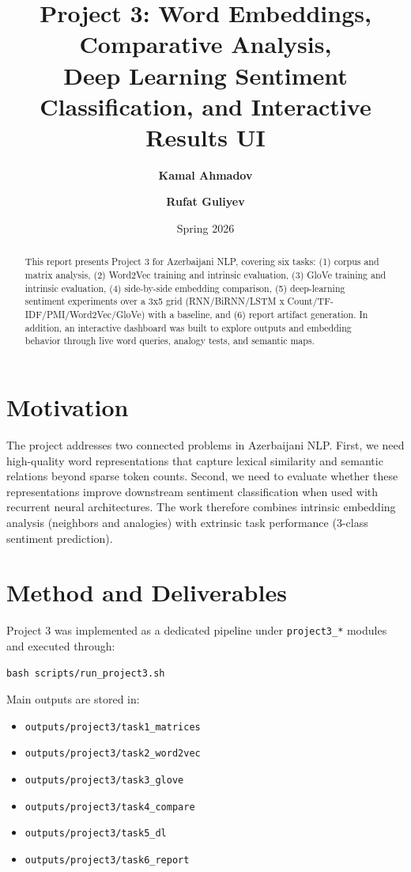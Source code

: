 \documentclass[11pt]{article}
\title{Project 3: Word Embeddings, Comparative Analysis,\\Deep Learning Sentiment Classification, and Interactive Results UI}
\author{
\textbf{Kamal Ahmadov} \and \textbf{Rufat Guliyev}
}
\date{Spring 2026}
\begin{document}
\maketitle

\begin{abstract}
This report presents Project 3 for Azerbaijani NLP, covering six tasks: (1) corpus and matrix analysis, (2) Word2Vec training and intrinsic evaluation, (3) GloVe training and intrinsic evaluation, (4) side-by-side embedding comparison, (5) deep-learning sentiment experiments over a 3x5 grid (RNN/BiRNN/LSTM x Count/TF-IDF/PMI/Word2Vec/GloVe) with a baseline, and (6) report artifact generation. In addition, an interactive dashboard was built to explore outputs and embedding behavior through live word queries, analogy tests, and semantic maps.
\end{abstract}

\section{Motivation}
The project addresses two connected problems in Azerbaijani NLP. First, we need high-quality word representations that capture lexical similarity and semantic relations beyond sparse token counts. Second, we need to evaluate whether these representations improve downstream sentiment classification when used with recurrent neural architectures. The work therefore combines intrinsic embedding analysis (neighbors and analogies) with extrinsic task performance (3-class sentiment prediction).

\section{Method and Deliverables}
Project 3 was implemented as a dedicated pipeline under \texttt{project3\_*} modules and executed through:
\begin{verbatim}
bash scripts/run_project3.sh
\end{verbatim}

Main outputs are stored in:
\begin{itemize}
    \item \texttt{outputs/project3/task1\_matrices}
    \item \texttt{outputs/project3/task2\_word2vec}
    \item \texttt{outputs/project3/task3\_glove}
    \item \texttt{outputs/project3/task4\_compare}
    \item \texttt{outputs/project3/task5\_dl}
    \item \texttt{outputs/project3/task6\_report}
\end{itemize}
\end{document}
